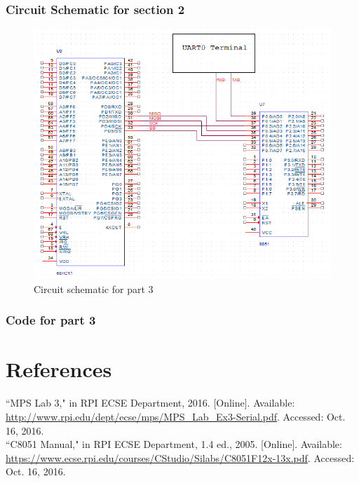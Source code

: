 \documentclass[12pt]{article}
\begin{document}
	\subsubsection{Circuit Schematic for section 2}
		\begin{figure}[H]
			\centering
			\includegraphics[width=\textwidth]{Part3Schematic.png}
			\caption{Circuit schematic for part 3}
			\label{schematic3}
		\end{figure}
	\pagebreak
	\subsubsection{Code for part 3}
		
	
\section{References} 
\noindent
``MPS Lab 3," in RPI ECSE Department, 2016. [Online]. Available: \url{http://www.rpi.edu/dept/ecse/mps/MPS_Lab_Ex3-Serial.pdf}. Accessed: Oct. 16, 2016.\\
\newline\noindent
``C8051 Manual," in RPI ECSE Department, 1.4 ed., 2005. [Online]. Available: \url{https://www.ecse.rpi.edu/courses/CStudio/Silabs/C8051F12x-13x.pdf}. Accessed: Oct. 16, 2016.
\end{document}
